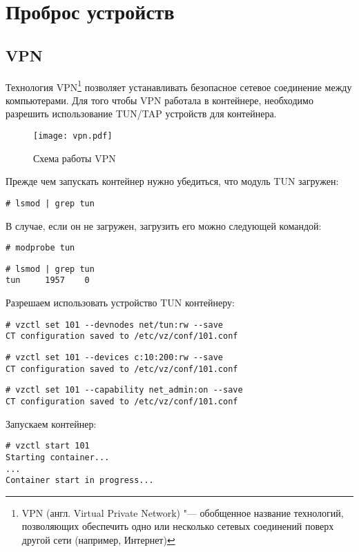 \section{Проброс устройств}
\subsection{VPN}

Технология VPN\footnote{VPN (англ. Virtual Private Network) "--- обобщенное название технологий, позволяющих обеспечить одно или несколько сетевых соединений поверх другой сети (например, Интернет)} позволяет устанавливать безопасное сетевое соединение между компьютерами.
Для того чтобы VPN работала в контейнере, необходимо разрешить использование TUN/TAP устройств для контейнера.
\begin{figure}[ht]
    \centering
	\texttt{[image: vpn.pdf]}
	\caption{Схема работы VPN}\label{pic:vpn}
\end{figure}

Прежде чем запускать контейнер нужно убедиться, что модуль TUN загружен:
\begin{lstlisting}
# lsmod | grep tun
\end{lstlisting}

В случае, если он не загружен, загрузить его можно следующей командой:
\begin{lstlisting}
# modprobe tun
\end{lstlisting}
\begin{lstlisting}
# lsmod | grep tun
tun     1957    0
\end{lstlisting}

Разрешаем использовать устройство TUN контейнеру:
\begin{lstlisting}
# vzctl set 101 --devnodes net/tun:rw --save
CT configuration saved to /etc/vz/conf/101.conf
\end{lstlisting}
\begin{lstlisting}
# vzctl set 101 --devices c:10:200:rw --save
CT configuration saved to /etc/vz/conf/101.conf
\end{lstlisting}
\begin{lstlisting}
# vzctl set 101 --capability net_admin:on --save
CT configuration saved to /etc/vz/conf/101.conf
\end{lstlisting}

Запускаем контейнер:
\begin{lstlisting}
# vzctl start 101
Starting container...
...
Container start in progress...
\end{lstlisting}

